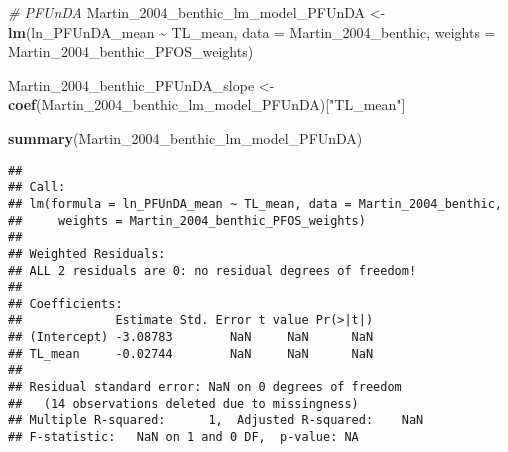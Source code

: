 \documentclass[
]{article}
\newenvironment{Shaded}{\begin{snugshade}}{\end{snugshade}}
\newcommand{\AttributeTok}[1]{\textcolor[rgb]{0.13,0.29,0.53}{#1}}
\newcommand{\CommentTok}[1]{\textcolor[rgb]{0.56,0.35,0.01}{\textit{#1}}}
\newcommand{\FunctionTok}[1]{\textcolor[rgb]{0.13,0.29,0.53}{\textbf{#1}}}
\newcommand{\NormalTok}[1]{#1}
\newcommand{\OtherTok}[1]{\textcolor[rgb]{0.56,0.35,0.01}{#1}}
\newcommand{\SpecialCharTok}[1]{\textcolor[rgb]{0.81,0.36,0.00}{\textbf{#1}}}
\newcommand{\StringTok}[1]{\textcolor[rgb]{0.31,0.60,0.02}{#1}}
\begin{document}
\begin{Shaded}
\begin{Highlighting}[]
\CommentTok{\# PFUnDA}
\NormalTok{Martin\_2004\_benthic\_lm\_model\_PFUnDA }\OtherTok{\textless{}{-}} \FunctionTok{lm}\NormalTok{(ln\_PFUnDA\_mean }\SpecialCharTok{\textasciitilde{}}\NormalTok{ TL\_mean, }
                                        \AttributeTok{data =}\NormalTok{ Martin\_2004\_benthic,}
                                        \AttributeTok{weights =}\NormalTok{ Martin\_2004\_benthic\_PFOS\_weights)}

\NormalTok{Martin\_2004\_benthic\_PFUnDA\_slope }\OtherTok{\textless{}{-}} \FunctionTok{coef}\NormalTok{(Martin\_2004\_benthic\_lm\_model\_PFUnDA)[}\StringTok{"TL\_mean"}\NormalTok{]}

\FunctionTok{summary}\NormalTok{(Martin\_2004\_benthic\_lm\_model\_PFUnDA)}
\end{Highlighting}
\end{Shaded}

\begin{verbatim}
## 
## Call:
## lm(formula = ln_PFUnDA_mean ~ TL_mean, data = Martin_2004_benthic, 
##     weights = Martin_2004_benthic_PFOS_weights)
## 
## Weighted Residuals:
## ALL 2 residuals are 0: no residual degrees of freedom!
## 
## Coefficients:
##             Estimate Std. Error t value Pr(>|t|)
## (Intercept) -3.08783        NaN     NaN      NaN
## TL_mean     -0.02744        NaN     NaN      NaN
## 
## Residual standard error: NaN on 0 degrees of freedom
##   (14 observations deleted due to missingness)
## Multiple R-squared:      1,  Adjusted R-squared:    NaN 
## F-statistic:   NaN on 1 and 0 DF,  p-value: NA
\end{verbatim}
\end{document}
